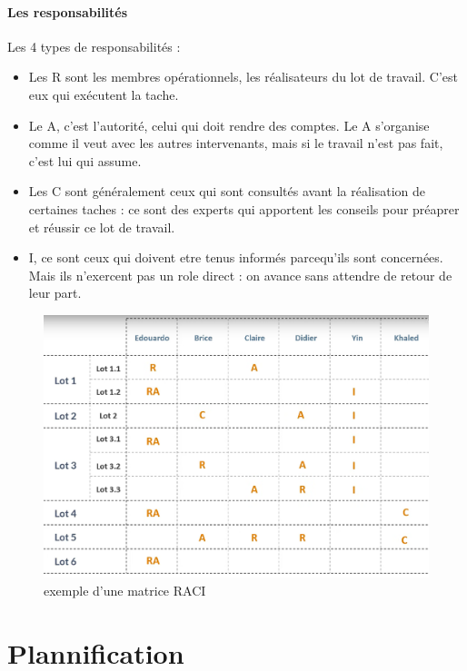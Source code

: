 \paragraph*{Les responsabilités}
Les 4 types de responsabilités :
\begin{itemize}
	\item Les R sont les membres opérationnels, les réalisateurs du lot de travail. C'est eux qui exécutent la tache.
	\item Le A, c'est l'autorité, celui qui doit rendre des comptes. Le A s'organise comme il veut avec les autres intervenants, mais si le travail n'est pas fait, c'est lui qui assume.
	\item Les C sont généralement ceux qui sont consultés avant la réalisation de certaines taches : ce sont des experts qui apportent les conseils pour préaprer et réussir ce lot de travail.
	\item I, ce sont ceux qui doivent etre tenus informés parcequ'ils sont concernées. Mais ils n'exercent pas un role direct : on avance sans attendre de retour de leur part.
\end{itemize}
\begin{figure}[!h]
	\begin{center}
		\includegraphics[scale=0.2]{images/exemple_matrice_raci.png}
		\caption{exemple d'une matrice RACI}
	\end{center}
\end{figure}
\section{Plannification}
